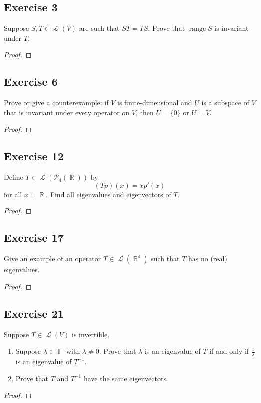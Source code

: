 \documentclass[letterpaper, 12pt]{amsart}
\DeclareMathOperator{\R}{\mathbb{R}}				%
\DeclareMathOperator{\F}{\mathbb{F}}				%
\DeclareMathOperator{\Ell}{\mathscr{L}}				%
\DeclareMathOperator{\range}{\text{range }}			%
\theoremstyle{definition}  							%
\begin{document}
		\subsection*{Exercise 3}
		Suppose $S,T \in \Ell(V)$ are such that $ST = TS$. 
		Prove that $\range S$ is invariant under $T$.

		\begin{proof}
		\end{proof}

		\subsection*{Exercise 6}
		Prove or give a counterexample: if $V$ is finite-dimensional and $U$ is a subspace of $V$ that is invariant under every operator on $V$, then $U = \{ 0 \}$ or $U = V$.

		\begin{proof}
		\end{proof}

		\subsection*{Exercise 12}
		Define $T \in \Ell\left( \mathcal{P}_{4}(\R) \right)$ by $$(Tp)(x) = xp'(x)$$ for all $x = \R$. 
		Find all eigenvalues and eigenvectors of $T$.

		\begin{proof}
		\end{proof}

		\subsection*{Exercise 17}
		Give an example of an operator $T \in \Ell (\R^{4})$ such that $T$ has no (real) eigenvalues.

		\begin{proof}
		\end{proof}

		\subsection*{Exercise 21}
		Suppose $T \in \Ell(V)$ is invertible.
		\begin{enumerate}[\hspace{5mm} (a)]
			\item Suppose $\lambda \in \F$ with $\lambda \neq 0$.
			Prove that $\lambda$ is an eigenvalue of $T$ if and only if $\tfrac{1}{\lambda}$ is an eigenvalue of $T^{-1}$.

			\item Prove that $T$ and $T^{-1}$ have the same eigenvectors.
		\end{enumerate}
		
		\begin{proof}
		\end{proof}
\end{document}
